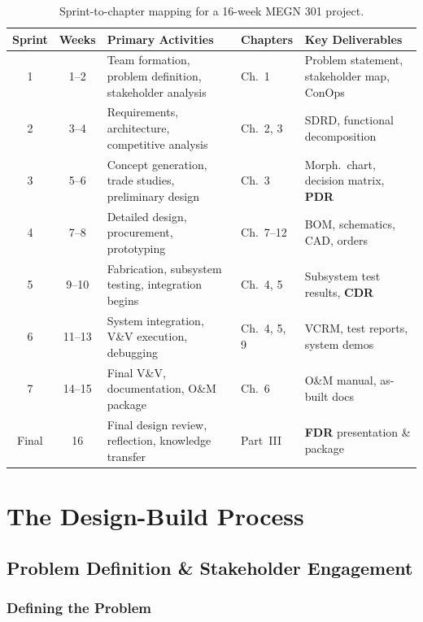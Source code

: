 \documentclass[11pt,letterpaper,twoside,openany]{book}
\begin{document}
\begin{table}[htbp]
\centering\small
\begin{tabularx}{\textwidth}{c c X l X}
\toprule
\textbf{Sprint} & \textbf{Weeks} & \textbf{Primary Activities} & \textbf{Chapters} & \textbf{Key Deliverables} \\
\midrule
1 & 1--2 & Team formation, problem definition, stakeholder analysis & Ch.~1 & Problem statement, stakeholder map, ConOps \\
2 & 3--4 & Requirements, architecture, competitive analysis & Ch.~2, 3 & SDRD, functional decomposition \\
3 & 5--6 & Concept generation, trade studies, preliminary design & Ch.~3 & Morph.\ chart, decision matrix, \textbf{PDR} \\
4 & 7--8 & Detailed design, procurement, prototyping & Ch.~7--12 & BOM, schematics, CAD, orders \\
5 & 9--10 & Fabrication, subsystem testing, integration begins & Ch.~4, 5 & Subsystem test results, \textbf{CDR} \\
6 & 11--13 & System integration, V\&V execution, debugging & Ch.~4, 5, 9 & VCRM, test reports, system demos \\
7 & 14--15 & Final V\&V, documentation, O\&M package & Ch.~6 & O\&M manual, as-built docs \\
Final & 16 & Final design review, reflection, knowledge transfer & Part~III & \textbf{FDR} presentation \& package \\
\bottomrule
\end{tabularx}
\caption{Sprint-to-chapter mapping for a 16-week MEGN 301 project.}
\end{table}

\mainmatter


\part{The Design-Build Process}

\chapter{Problem Definition \& Stakeholder Engagement}

\vspace{1em}


\vspace{1em}

\section{Defining the Problem}
\end{document}
